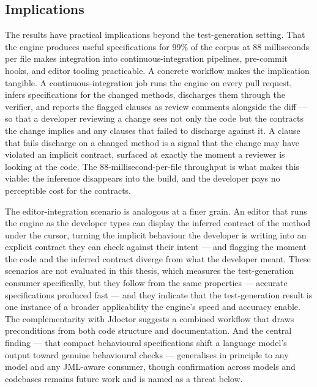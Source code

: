 \subsection{Implications}

The results have practical implications beyond the test-generation setting.
That the engine produces useful specifications for 99\% of the corpus at 88
milliseconds per file makes integration into continuous-integration pipelines,
pre-commit hooks, and editor tooling practicable. A concrete workflow makes the
implication tangible. A continuous-integration job runs the engine on every pull
request, infers specifications for the changed methods, discharges them through the
verifier, and reports the flagged clauses as review comments alongside the
diff --- so that a developer reviewing a change sees not only the code but the
contracts the change implies and any clauses that failed to discharge against it. A
clause that fails discharge on a changed method is a signal that the change may have
violated an implicit contract, surfaced at exactly the moment a reviewer is looking
at the code. The 88-millisecond-per-file throughput is what makes this viable: the
inference disappears into the build, and the developer pays no perceptible cost for
the contracts.

The editor-integration scenario is analogous at a finer grain. An editor that runs
the engine as the developer types can display the inferred contract of the method
under the cursor, turning the implicit behaviour the developer is writing into an
explicit contract they can check against their intent --- and flagging the moment
the code and the inferred contract diverge from what the developer meant. These
scenarios are not evaluated in this thesis, which measures the test-generation
consumer specifically, but they follow from the same properties --- accurate
specifications produced fast --- and they indicate that the test-generation result
is one instance of a broader applicability the engine's speed and accuracy enable. The complementarity with
Jdoctor suggests a combined workflow that draws preconditions from both code
structure and documentation. And the central finding --- that compact
behavioural specifications shift a language model's output toward genuine
behavioural checks --- generalises in principle to any model and any JML-aware
consumer, though confirmation across models and codebases remains future work
and is named as a threat below.

